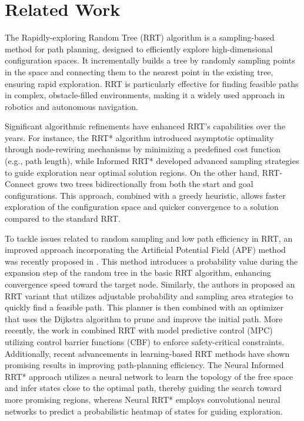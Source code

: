 \section{Related Work}
\label{sec:Related_Work}

The Rapidly-exploring Random Tree (RRT) algorithm \cite{lavalle1998rapidly} is a sampling-based method for path planning, designed to efficiently explore high-dimensional configuration spaces. It incrementally builds a tree by randomly sampling points in the space and connecting them to the nearest point in the existing tree, ensuring rapid exploration. RRT is particularly effective for finding feasible paths in complex, obstacle-filled environments, making it a widely used approach in robotics and autonomous navigation.

Significant algorithmic refinements have enhanced RRT's capabilities over the years. For instance, the RRT* algorithm \cite{karaman2011sampling} introduced asymptotic optimality through node-rewiring mechanisms by minimizing a predefined cost function (e.g., path length), while Informed RRT* \cite{gammell2014informed} developed advanced sampling strategies to guide exploration near optimal solution regions. On the other hand, RRT-Connect \cite{kuffner2000rrt} grows two trees bidirectionally from both the start and goal configurations. This approach, combined with a greedy heuristic, allows faster exploration of the configuration space and quicker convergence to a solution compared to the standard RRT.

To tackle issues related to random sampling and low path efficiency in RRT, an improved approach incorporating the Artificial Potential Field (APF) method was recently proposed in \cite{huang2021path}. This method introduces a probability value during the expansion step of the random tree in the basic RRT algorithm, enhancing convergence speed toward the target node. Similarly, the authors in \cite{app14010025} proposed an RRT variant that utilizes adjustable probability and sampling area strategies to quickly find a feasible path. This planner is then combined with an optimizer that uses the Dijkstra algorithm to prune and improve the initial path. More recently, the work in \cite{liu2024rrt} combined RRT with model predictive control (MPC) utilizing control barrier functions (CBF) to enforce safety-critical constraints. Additionally, recent advancements in learning-based RRT methods have shown promising results in improving path-planning efficiency. The Neural Informed RRT* approach \cite{huang2024neural} utilizes a neural network to learn the topology of the free space and infer states close to the optimal path, thereby guiding the search toward more promising regions, whereas Neural RRT* \cite{wang2020neural} employs convolutional neural networks to predict a probabilistic heatmap of states for guiding exploration.

